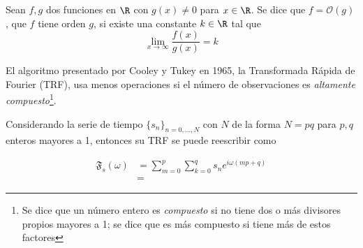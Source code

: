 \begin{defn}
Sean $f, g$ dos funciones en $\R$ con $g(x)\neq 0$ para $x\in \R$. Se dice que $f = \mathcal{O}(g)$,
que $f$ tiene orden $g$, si existe una constante $k\in \R$ tal que
\begin{equation*}
\lim_{x\rightarrow \infty} \frac{f(x)}{g(x)} = k
\end{equation*}
\label{orden}
\end{defn}

El algoritmo presentado por Cooley y Tukey en 1965, la Transformada Rápida de Fourier 
(TRF), usa menos operaciones si el número de observaciones es \textit{altamente 
compuesto}\footnote{Se dice que un número entero es \textit{compuesto} si no tiene dos o más
divisores propios mayores a 1; se dice que es más compuesto si tiene más de estos factores}.

Considerando la serie de tiempo $\{s_n\}_{n=0,\dots,N}$ con $N$ de la forma $N= p q$ para 
$p, q$ enteros mayores a 1, entonces su TRF se puede reescribir como

\begin{align*}
\mathfrak{F}_s(\omega) &= \sum_{m = 0}^{p} \sum_{k=0}^{q} s_n e^{i \omega (mp + q)} 
\\
&= 
\end{align*}


%
%

